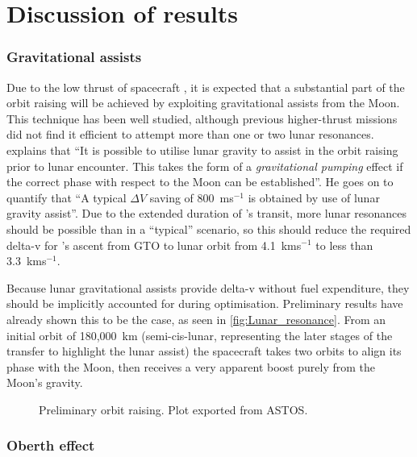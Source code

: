 \chapter{Discussion of results} \label{cha:Discussion-of-results}

\subsection{Gravitational assists}

Due to the low thrust of spacecraft \BW, it is expected that a substantial part of the orbit raising will be achieved by exploiting gravitational assists from the Moon. This technique has been well studied, although previous higher-thrust missions did not find it efficient to attempt more than one or two lunar resonances. \textcite{Kemble2006} explains that \enquote{It is possible to utilise lunar gravity to assist in the orbit raising prior to lunar encounter. This takes the form of a \emph{gravitational pumping} effect if the correct phase with respect to the Moon can be established}. He goes on to quantify that \enquote{A typical $\Delta V$ saving of 800~ms$^{-1}$ is obtained by use of lunar gravity assist}. Due to the extended duration of \BW's transit, more lunar resonances should be possible than in a \enquote{typical} scenario, so this should reduce the required delta-v for \BW's ascent from GTO to lunar orbit from 4.1~kms$^{-1}$ to less than 3.3~kms$^{-1}$.

Because lunar gravitational assists provide delta-v without fuel expenditure, they should be implicitly accounted for during optimisation. Preliminary results have already shown this to be the case, as seen in \autoref{fig:Lunar_resonance}. From an initial orbit of 180,000~km (semi-cis-lunar, representing the later stages of the transfer to highlight the lunar assist) the spacecraft takes two orbits to align its phase with the Moon, then receives a very apparent boost purely from the Moon's gravity.

\begin{figure}
\begin{center}
\end{center}
\caption{Preliminary orbit raising. Plot exported from ASTOS.}
\label{fig:Lunar_resonance}
\end{figure}

\subsection{Oberth effect}


